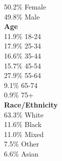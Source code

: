 50.2\% Female \\
49.8\% Male \\

\textbf{Age} \\
11.9\% 18-24 \\
17.9\% 25-34 \\
16.6\% 35-44 \\
15.7\% 45-54 \\
27.9\% 55-64 \\
9.1\% 65-74 \\
0.9\% 75+ \\

\textbf{Race/Ethnicity} \\
63.3\% White \\
11.6\% Black \\
11.0\% Mixed \\
7.5\% Other \\
6.6\% Asian \\

